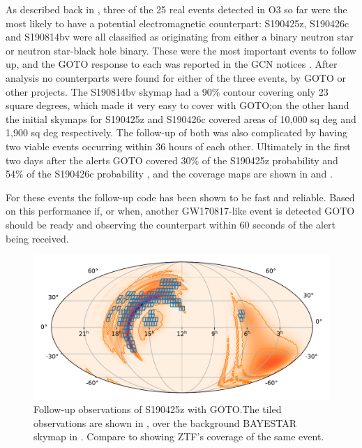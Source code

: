 \begin{colsection}
\begin{colsection}
As described back in , three of the 25 real events detected in O3 so far were the most likely to have a potential electromagnetic counterpart: S190425z, S190426c and S190814bv were all classified as originating from either a binary neutron star or neutron star-black hole binary. These were the most important events to follow up, and the GOTO response to each was reported in the GCN notices \citet{GW190425_GOTO, GW190426_GOTO, GW190814_GOTO}. After analysis no counterparts were found for either of the three events, by GOTO or other projects. The S190814bv skymap had a 90\% contour covering only 23 square degrees, which made it very easy to cover with GOTO;\@ on the other hand the initial skymaps for S190425z and S190426c covered areas of 10,000 sq deg and 1,900 sq deg respectively. The follow-up of both was also complicated by having two viable events occurring within 36 hours of each other. Ultimately in the first two days after the alerts GOTO covered 30\% of the S190425z probability \citep{GW190425_GOTO} and 54\% of the S190426c probability \citep{GW190426_GOTO}, and the coverage maps are shown in  and .

For these events the follow-up code has been shown to be fast and reliable. Based on this performance if, or when, another GW170817-like event is detected GOTO should be ready and observing the counterpart within 60 seconds of the alert being received.

\begin{figure}[p]
    \begin{center}
        \includegraphics[width=0.9\linewidth]{images/190425_goto.pdf}
    \end{center}
    \caption[Follow-up observations of S190425z with GOTO]{
        Follow-up observations of S190425z with GOTO.\@ The tiled observations are shown in , over the background BAYESTAR skymap in . Compare to  showing ZTF's coverage of the same event.
        }\label{fig:190425_goto}
\end{figure}


\end{colsection}
\end{colsection}
